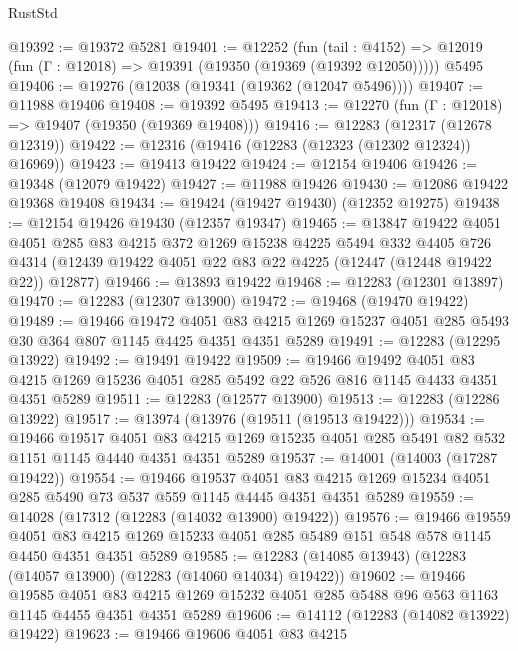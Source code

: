 \begin{lexlean}{RustStd}
\begin{coremodule}
@19392 := @19372 @5281
@19401 := @12252
    (fun (tail : @4152) => @12019 (fun (Γ : @12018) => @19391 (@19350 (@19369 (@19392 @12050)))))
    @5495
@19406 := @19276 (@12038 (@19341 (@19362 (@12047 @5496))))
@19407 := @11988 @19406
@19408 := @19392 @5495
@19413 := @12270 (fun (Γ : @12018) => @19407 (@19350 (@19369 @19408)))
@19416 := @12283 (@12317 (@12678 @12319))
@19422 := @12316 (@19416 (@12283 (@12323 (@12302 @12324)) @16969))
@19423 := @19413 @19422
@19424 := @12154 @19406
@19426 := @19348 (@12079 @19422)
@19427 := @11988 @19426
@19430 := @12086 @19422 @19368 @19408
@19434 := @19424 (@19427 @19430) (@12352 @19275)
@19438 := @12154 @19426 @19430 (@12357 @19347)
@19465 := @13847
    @19422
    @4051
    @4051
    @285
    @83
    @4215
    @372
    @1269
    @15238
    @4225
    @5494
    @332
    @4405
    @726
    @4314
    (@12439 @19422 @4051 @22 @83 @22 @4225 (@12447 (@12448 @19422 @22)) @12877)
@19466 := @13893 @19422
@19468 := @12283 (@12301 @13897)
@19470 := @12283 (@12307 @13900)
@19472 := @19468 (@19470 @19422)
@19489 := @19466
    @19472
    @4051
    @83
    @4215
    @1269
    @15237
    @4051
    @285
    @5493
    @30
    @364
    @807
    @1145
    @4425
    @4351
    @4351
    @5289
@19491 := @12283 (@12295 @13922)
@19492 := @19491 @19422
@19509 := @19466
    @19492
    @4051
    @83
    @4215
    @1269
    @15236
    @4051
    @285
    @5492
    @22
    @526
    @816
    @1145
    @4433
    @4351
    @4351
    @5289
@19511 := @12283 (@12577 @13900)
@19513 := @12283 (@12286 @13922)
@19517 := @13974 (@13976 (@19511 (@19513 @19422)))
@19534 := @19466
    @19517
    @4051
    @83
    @4215
    @1269
    @15235
    @4051
    @285
    @5491
    @82
    @532
    @1151
    @1145
    @4440
    @4351
    @4351
    @5289
@19537 := @14001 (@14003 (@17287 @19422))
@19554 := @19466
    @19537
    @4051
    @83
    @4215
    @1269
    @15234
    @4051
    @285
    @5490
    @73
    @537
    @559
    @1145
    @4445
    @4351
    @4351
    @5289
@19559 := @14028 (@17312 (@12283 (@14032 @13900) @19422))
@19576 := @19466
    @19559
    @4051
    @83
    @4215
    @1269
    @15233
    @4051
    @285
    @5489
    @151
    @548
    @578
    @1145
    @4450
    @4351
    @4351
    @5289
@19585 := @12283 (@14085 @13943) (@12283 (@14057 @13900) (@12283 (@14060 @14034) @19422))
@19602 := @19466
    @19585
    @4051
    @83
    @4215
    @1269
    @15232
    @4051
    @285
    @5488
    @96
    @563
    @1163
    @1145
    @4455
    @4351
    @4351
    @5289
@19606 := @14112 (@12283 (@14082 @13922) @19422)
@19623 := @19466
    @19606
    @4051
    @83
    @4215

\end{coremodule}
\end{lexlean}
